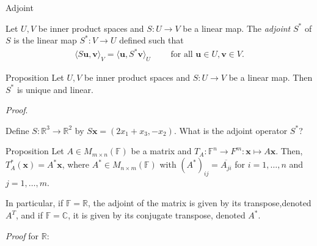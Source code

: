 \documentclass [aspectratio=169]{beamer}
\newcommand{\bu}{{\mathbf{u}}}
\newcommand{\bv}{{\mathbf{v}}}
\newcommand{\bx}{{\mathbf{x}}}
\newcommand{\innerprod}[1]{\langle #1 \rangle}
\newcommand{\R}{{\mathbb{R}}}
\newcommand{\C}{{\mathbb{C}}}
\newcommand{\F}{{\mathbb{F}}}
\begin{document}
\begin{frame}{Adjoint}
\begin{definition}
Let $U,V$ be inner product spaces and $S\colon U \to V$ be a linear map. The \emph{adjoint} $S^*$ of $S$ is the linear map $S^*\colon V \to U$ defined such that 
\begin{align*}
    \innerprod{S\bu,\bv}_V = \innerprod{\bu,S^*\bv}_U \qquad \text{ for all } \bu\in U, \bv\in V.
\end{align*}
\end{definition}
\end{frame}


\begin{frame}
\begin{exampleblock}{Proposition}
Let $U,V$ be inner product spaces and $S\colon U \to V$ be a linear map. Then $S^*$ is unique and linear.
\end{exampleblock}

\textit{Proof}.
\vspace{5.5cm}

\end{frame}

\begin{frame}

\end{frame}


\begin{frame}
\begin{example}
Define $S \colon \R^3 \to \R^2$ by $S\bx = (2x_1+x_3,-x_2)$. What is the adjoint operator $S^*$?
\end{example}
\vspace{5.5cm}

\end{frame}


\begin{frame}
\begin{exampleblock}{Proposition}
Let $A\in M_{m\times n}(\F)$ be a matrix and $T_A\colon \F^n\to F^m \colon \bx \mapsto A\bx$. Then, $T_A^*(\bx) = A^* \bx $, where $A^*\in M_{n\times m}(\F)$ with $(A^*)_{ij} = \overline{A_{ji}}$ for $i=1,\ldots,n$ and $j=1,\ldots,m$. 

\vspace{1em}
In particular, if $\F = \R$, the adjoint of the matrix is given by its transpose,denoted $A^T$, and if $\F = \C$, it is given by its conjugate transpose, denoted $A^*$.
\end{exampleblock}
\end{frame}

\begin{frame}
\textit{Proof} for $\R$:
\vspace{6.5cm}
\end{frame}
\end{document}
